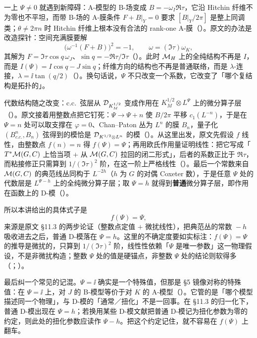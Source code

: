 一上 $\Psi\neq0$ 就遇到新障碍：A-模型的 B-场变成 $B=-\omega_I\Re\tau$，它沿 Hitchin 纤维不为零也不平坦，而带 B-场的 A-膜条件 $F+B|_Y=0$ 要求 $[B|_Y/2\pi]$ 是整上同调类；$\theta\neq2\pi n$ 时 Hitchin 纤维上根本没有合法的 rank-one A-膜（）。原文的办法是改造探针：空间充满膜要解
\begin{equation}
\bigl(\omega^{-1}(F+B)\bigr)^2=-1,\qquad \omega=(\Im\tau)\omega_K ,
\label{eq:cc-psi}
\end{equation}
其解为 $F=\Im\tau\cos q\,\omega_J$、$\sin q=-\Re\tau/\Im\tau$（）。此时 $\mathcal{M}_{H}$ 上的全纯结构不再是 $I$，而是 $I(\Psi)=I\cos q-J\sin q$；纤维方向的结构也不再是普通联络，而是 $\lambda$-连接，$\lambda=\ii\tan(q/2)$（）。换句话说，$\Psi$ 不只改变一个系数，它改变了「哪个复结构是拓扑的」。

代数结构随之改变：c.c.\ 弦层从 $\mathcal{D}_{K_M^{1/2}}$ 变成作用在 $K_M^{1/2}\otimes L^{\Psi}$ 上的微分算子层（）。原文接着用整数点把它钉死：$\Psi\to\Psi+n$ 使 $B/2\pi$ 平移 $c_1(L^{-n})$，于是在 $\Psi=n$ 处可以取支撑在 $\varphi=0$、Chan--Paton 丛为 $L^n$ 的膜 $B_n$，量子化 $(B_{c.c.}^n,B_n)$ 弦得到的模恰是 $\mathcal{D}_{K^{1/2}\otimes L^n}$ 的模（）。从这里出发，原文先假设 $f$ 线性，由整数点 $f(n)=n$ 得 $f(\Psi)=\Psi$；再用欧氏作用量证明线性：把它写成「$T^*\mathcal{M}(G,C)$ 上恰当项 $+$ 从 $\mathcal{M}(G,C)$ 拉回的闭二形式」，后者的系数正比于 $\Re\tau$，而粘接修正只需算到 $1/(\Im\tau)^2$ 阶，在这一阶上严格线性（）。最后一个常数来自 $\mathcal{M}(G,C)$ 的典范线丛同构于 $L^{-2h}$（$h$ 为 $G$ 的对偶 Coxeter 数），于是任意 $\Psi$ 处的代数层是 $L^{\Psi-h}$ 上的全纯微分算子层；取 $\Psi=h$ 就得到\textbf{普通}微分算子层，即作用在函数上的 D-模（）。

所以本讲给出的具体式子是
\begin{equation}
f(\Psi)=\Psi ,
\label{eq:f-Psi}
\end{equation}
来源是原文 \S11.3 的两步论证（整数点定值 $+$ 微扰线性），把典范丛的常数 $\!-h$ 吸收进去之后，普通 D-模落在 $\Psi=h$。这里的不确定度要如实标注：$f(\Psi)=\Psi$ 的推导是微扰的，只算到 $1/(\Im\tau)^2$ 阶，线性性依赖「$\Psi$ 是唯一参数」这一物理假设，不是非微扰构造；整数 $\Psi$ 处的值是硬锚点，非整数 $\Psi$ 处的结论则软得多（；）。

最后纠一个常见的记混。$\Psi=\ii$ 确实是一个特殊值，但那是 \S5 镜像对称的特殊值：在 $\Psi=\ii$ 上，对 $J$ 的 B-模型等价于对 $K$ 的 A-模型（）。它管的是「哪个模型描述同一个物理」，与 D-模的「通常／扭化」不是一回事。在 \S11.3 的归一化下，普通 D-模出现在 $\Psi=h$；若换用某些 D-模文献把普通 D-模记为扭化参数为零的约定，则此处的扭化参数应读作 $\Psi-h$。把这个约定记住，就不容易在 $f(\Psi)$ 上翻车。

